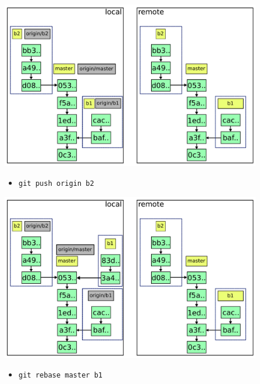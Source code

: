 \documentclass{beamer}
\begin{document}
\begin{frame}{}
  \centering
  \includegraphics[width=0.85\textwidth]{img/4.pdf}
  \begin{itemize}
  \small
  \item \lstinline|git push origin b2| \vspace{0.46cm} \\
  \end{itemize}
\end{frame}

\begin{frame}{}
  \centering
  \includegraphics[width=0.85\textwidth]{img/5.pdf}
  \begin{itemize}
  \small
  \item \lstinline|git rebase master b1| \vspace{0.46cm} \\
  \end{itemize}
\end{frame}
\end{document}
